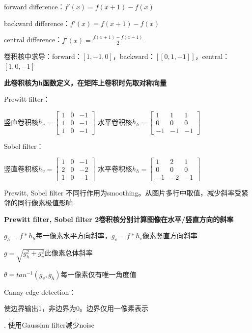 \documentclass[UTF8]{ctexart}
\begin{document}
  \quad forward difference：$f'(x) = f(x + 1) - f(x)$

  \quad backward difference：$f'(x) = f(x + 1) - f(x)$
  
  \quad central difference：$f'(x) = \frac{f(x + 1) - f(x - 1)}{2}$

  卷积核中求导：forward：$[1, -1, 0]$，backward：$[[0, 1, -1]]$，central：$[1, 0, -1]$

  \quad \textbf{此卷积核为h函数定义，在矩阵上卷积时先取对称向量}

  Prewitt filter：

  \quad 竖直卷积核$h_v = \begin{bmatrix}
    1 & 0 & -1 \\
    1 & 0 & -1 \\
    1 & 0 & -1
    \end{bmatrix}$
    水平卷积核$h_h = \begin{bmatrix}
      1 & 1 & 1 \\
      0 & 0 & 0 \\
      -1 & -1 & -1
      \end{bmatrix}$

  Sobel filter：

  \quad 竖直卷积核$h_v = \begin{bmatrix}
    1 & 0 & -1 \\
    2 & 0 & -2 \\
    1 & 0 & -1
    \end{bmatrix}$
    水平卷积核$h_h = \begin{bmatrix}
      1 & 2 & 1 \\
      0 & 0 & 0 \\
      -1 & -2 & -1
      \end{bmatrix}$

  Prewitt, Sobel filter 不同行作用为smoothing。从图片多行中取值，减少斜率受紧邻的同行像素极值影响

  \textbf{Prewitt filter, Sobel filter 2卷积核分别计算图像在水平/竖直方向的斜率}

  \quad $g_h = f * h_h$每一像素水平方向斜率，$g_v = f * h_v$像素竖直方向斜率

  \quad $g = \sqrt{g_h^2 + g_v^2}$此像素总体斜率

  \quad $\theta = tan^{-1}(g_v, g_h)$每一像素仅有唯一角度值

  Canny edge detection：

  \quad 使边界输出1，非边界为0。边界仅用一像素表示

  . 使用Gaussian filter减少noise
\end{document}
